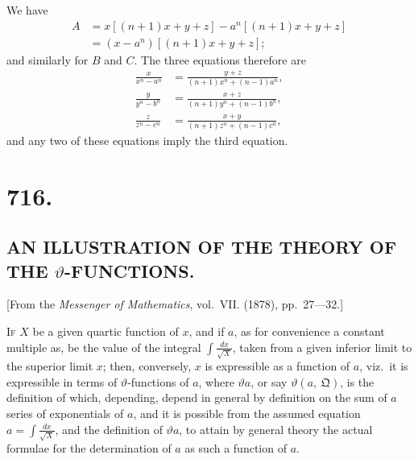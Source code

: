 \documentclass[12pt,a4paper,oneside]{book}
\theoremstyle{plain}
\theoremstyle{definition}
\theoremstyle{remark}
\begin{document}
\newpage
We have
\begin{align*}
A&=x\left[(n+1)x+y+z\right]-a^n\left[(n+1)x+y+z\right]\\
&=(x-a^n)\left[(n+1)x+y+z\right];
\end{align*}
and similarly for $B$ and $C$. The three equations therefore are
\begin{align*}
\frac{x}{x^n-a^n}&=\frac{y+z}{(n+1)x^n+(n-1)a^n},\\
\frac{y}{y^n-b^n}&=\frac{x+z}{(n+1)y^n+(n-1)b^n},\\
\frac{z}{z^n-c^n}&=\frac{x+y}{(n+1)z^n+(n-1)c^n},
\end{align*}
and any two of these equations imply the third equation.

\vspace{2em}
\noindent\dotfill

\newpage
\section*{716.}
\subsection*{AN ILLUSTRATION OF THE THEORY OF THE $\vartheta$-FUNCTIONS.}

\begin{center}
\small [From the \textit{Messenger of Mathematics}, vol.~VII. (1878), pp.~27---32.]
\end{center}

\medskip

\textsc{If} $X$ be a given quartic function of $x$, and if $a$, as for convenience a constant multiple as, be the value of the integral $\int\frac{dx}{\sqrt{X}}$, taken from a given inferior limit to the superior limit $x$; then, conversely, $x$ is expressible as a function of $a$, viz.\ it is expressible in terms of $\vartheta$-functions of $a$, where $\vartheta a$, or say $\vartheta(a,\ \mathfrak{Q})$, is the definition of which, depending, depend in general by definition on the sum of $a$ series of exponentials of $a$, and it is possible from the assumed equation $a=\int\frac{dx}{\sqrt{X}}$, and the definition of $\vartheta a$, to attain by general theory the actual formulae for the determination of $a$ as such a function of $a$.
\end{document}
